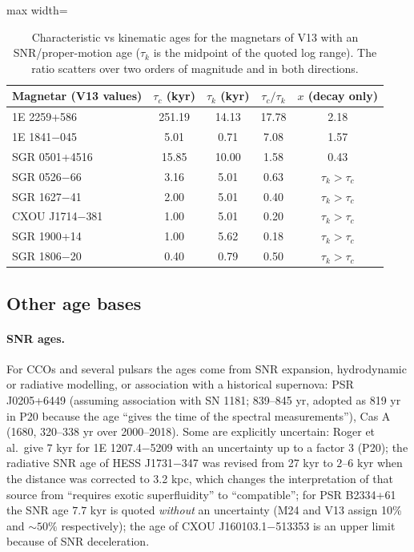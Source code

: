 \documentclass[11pt,a4paper]{article}
\begin{document}
\begin{table}[htbp]
\centering\small
\caption{Characteristic vs kinematic ages for the magnetars of V13 with an SNR/proper-motion age ($\tau_k$ is the midpoint of the quoted log range). The ratio scatters over two orders of magnitude and in both directions.}\label{tab:mag}
\begin{adjustbox}{max width=\textwidth}\begin{tabular}{lcccc}
\toprule
Magnetar (V13 values) & $\tau_c$ (kyr) & $\tau_k$ (kyr) & $\tau_c/\tau_k$ & $x$ (decay only)\\
\midrule
1E 2259+586 & 251.19 & 14.13 & 17.78 & 2.18\\
1E 1841$-$045 & 5.01 & 0.71 & 7.08 & 1.57\\
SGR 0501+4516 & 15.85 & 10.00 & 1.58 & 0.43\\
SGR 0526$-$66 & 3.16 & 5.01 & 0.63 & $\tau_k>\tau_c$\\
SGR 1627$-$41 & 2.00 & 5.01 & 0.40 & $\tau_k>\tau_c$\\
CXOU J1714$-$381 & 1.00 & 5.01 & 0.20 & $\tau_k>\tau_c$\\
SGR 1900+14 & 1.00 & 5.62 & 0.18 & $\tau_k>\tau_c$\\
SGR 1806$-$20 & 0.40 & 0.79 & 0.50 & $\tau_k>\tau_c$\\
\bottomrule
\end{tabular}\end{adjustbox}
\end{table}


\subsection{Other age bases}
\paragraph{SNR ages.} For CCOs and several pulsars the ages come from SNR expansion, hydrodynamic or radiative modelling, or association with a historical supernova: PSR J0205+6449 (assuming association with SN 1181; 839--845 yr, adopted as 819 yr in P20 because the age ``gives the time of the spectral measurements''), Cas A (1680, 320--338 yr over 2000--2018). Some are explicitly uncertain: Roger et al.\ give $7$ kyr for 1E 1207.4$-$5209 with an uncertainty up to a factor 3 (P20); the radiative SNR age of HESS J1731$-$347 was revised from 27 kyr to $2$--$6$ kyr when the distance was corrected to 3.2 kpc, which changes the interpretation of that source from ``requires exotic superfluidity'' to ``compatible''; for PSR B2334+61 the SNR age $7.7$ kyr is quoted \emph{without} an uncertainty (M24 and V13 assign 10\% and $\sim50\%$ respectively); the age of CXOU J160103.1$-$513353 is an upper limit because of SNR deceleration.
\end{document}
